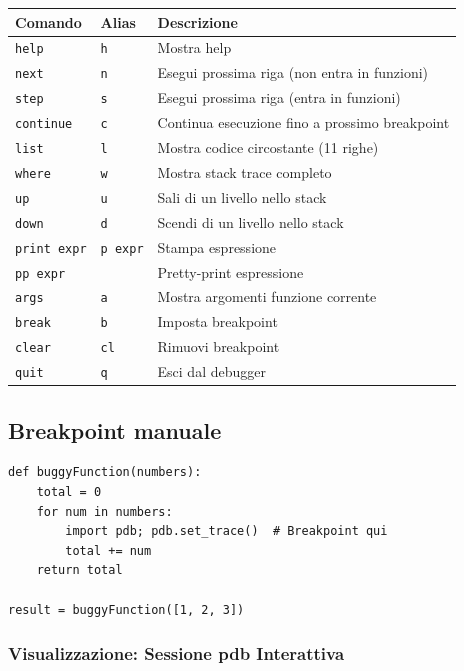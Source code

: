\begin{center}
\begin{tabular}{|l|l|p{6cm}|}
\hline
\textbf{Comando} & \textbf{Alias} & \textbf{Descrizione} \\
\hline
\texttt{help} & \texttt{h} & Mostra help \\
\hline
\texttt{next} & \texttt{n} & Esegui prossima riga (non entra in funzioni) \\
\hline
\texttt{step} & \texttt{s} & Esegui prossima riga (entra in funzioni) \\
\hline
\texttt{continue} & \texttt{c} & Continua esecuzione fino a prossimo breakpoint \\
\hline
\texttt{list} & \texttt{l} & Mostra codice circostante (11 righe) \\
\hline
\texttt{where} & \texttt{w} & Mostra stack trace completo \\
\hline
\texttt{up} & \texttt{u} & Sali di un livello nello stack \\
\hline
\texttt{down} & \texttt{d} & Scendi di un livello nello stack \\
\hline
\texttt{print expr} & \texttt{p expr} & Stampa espressione \\
\hline
\texttt{pp expr} & & Pretty-print espressione \\
\hline
\texttt{args} & \texttt{a} & Mostra argomenti funzione corrente \\
\hline
\texttt{break} & \texttt{b} & Imposta breakpoint \\
\hline
\texttt{clear} & \texttt{cl} & Rimuovi breakpoint \\
\hline
\texttt{quit} & \texttt{q} & Esci dal debugger \\
\hline
\end{tabular}
\end{center}

\subsection{Breakpoint manuale}

\begin{lstlisting}
def buggyFunction(numbers):
    total = 0
    for num in numbers:
        import pdb; pdb.set_trace()  # Breakpoint qui
        total += num
    return total

result = buggyFunction([1, 2, 3])
\end{lstlisting}

\subsubsection{Visualizzazione: Sessione pdb Interattiva}

